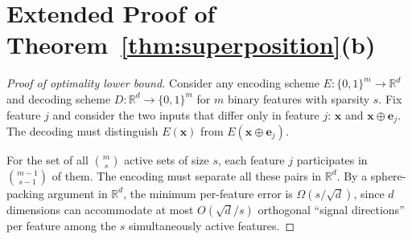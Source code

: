 \documentclass[11pt,a4paper]{article}
\theoremstyle{plain}
\theoremstyle{definition}
\theoremstyle{remark}
\newcommand{\R}{\mathbb{R}}
\begin{document}
\section{Extended Proof of Theorem~\ref{thm:superposition}(b)}%
\label{app:superposition-lb}

\begin{proof}[Proof of optimality lower bound]
Consider any encoding scheme $E : \{0,1\}^m \to \R^d$ and decoding scheme
$D : \R^d \to \{0,1\}^m$ for $m$ binary features with sparsity $s$.  Fix
feature $j$ and consider the two inputs that differ only in feature $j$:
$\mathbf{x}$ and $\mathbf{x} \oplus \mathbf{e}_j$.  The decoding must
distinguish $E(\mathbf{x})$ from $E(\mathbf{x} \oplus \mathbf{e}_j)$.

For the set of all $\binom{m}{s}$ active sets of size $s$, each feature $j$
participates in $\binom{m-1}{s-1}$ of them.  The encoding must separate all
these pairs in $\R^d$.  By a sphere-packing argument in $\R^d$, the minimum
per-feature error is $\Omega(s/\sqrt{d})$, since $d$ dimensions can
accommodate at most $O(\sqrt{d}/s)$ orthogonal ``signal directions'' per
feature among the $s$ simultaneously active features.
\end{proof}
\end{document}
